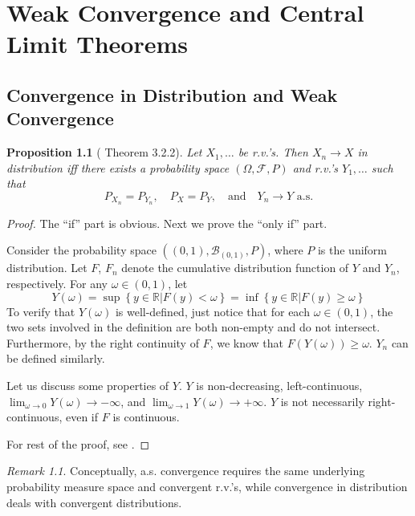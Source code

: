 \documentclass[openany]{book}
\newtheorem{proposition}{Proposition}[chapter]
\theoremstyle{definition}
\theoremstyle{remark}
\newtheorem*{remark}{Remark}
\begin{document}
\chapter{Weak Convergence and Central Limit Theorems}\label{chp:CLT} %
\section{Convergence in Distribution and Weak Convergence}
\begin{proposition}[\cite{D10} Theorem 3.2.2]
    Let $X_1,\ldots$ be r.v.'s. Then $X_n\to X$ in distribution iff there exists a probability space $(\Omega,\mathcal{F},P)$ and r.v.'s $Y_1,\ldots$ such that
    \begin{equation*}
        P_{X_n}=P_{Y_n},\quad P_X=P_Y,\quad\textrm{and}\quad Y_n\to Y\textrm{ a.s.}
    \end{equation*}
\end{proposition}
\begin{proof}
    The ``if'' part is obvious. Next we prove the ``only if'' part.

    Consider the probability space $\left((0,1),\mathcal{B}_{(0,1)},P\right)$, where $P$ is the uniform distribution. Let $F$, $F_n$ denote the cumulative distribution function of $Y$ and $Y_n$, respectively. For any $\omega\in(0,1)$, let
    \begin{equation*}
        Y(\omega)=\sup\left\{y\in \mathbb{R}|F(y)<\omega\right\}=\inf\left\{y\in \mathbb{R}|F(y)\ge\omega\right\}
    \end{equation*}
    To verify that $Y(\omega)$ is well-defined, just notice that for each $\omega\in(0,1)$, the two sets involved in the definition are both non-empty and do not intersect. Furthermore, by the right continuity of $F$, we know that $F\left(Y(\omega)\right)\ge\omega$. $Y_n$ can be defined similarly.

    Let us discuss some properties of $Y$. $Y$ is non-decreasing, left-continuous, $\lim_{\omega\to0}Y(\omega)\to-\infty$, and $\lim_{\omega\to1}Y(\omega)\to+\infty$. $Y$ is not necessarily right-continuous, even if $F$ is continuous.

    For rest of the proof, see \cite{D10}.
\end{proof}
\begin{remark}
    Conceptually, a.s. convergence requires the same underlying probability measure space and convergent r.v.'s, while convergence in distribution deals with convergent distributions.
\end{remark}
\end{document}
